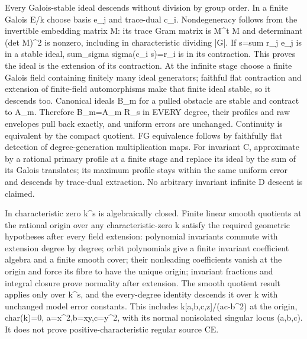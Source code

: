 \documentclass[11pt]{article}
\begin{document}
Every Galois-stable ideal descends without division by group order. In a finite Galois E/k choose basis e\_j and trace-dual c\_i. Nondegeneracy follows from the invertible embedding matrix M: its trace Gram matrix is M\textasciicircum{}t M and determinant (det M)\textasciicircum{}2 is nonzero, including in characteristic dividing |G|. If s=sum r\_j e\_j is in a stable ideal, sum\_sigma sigma(c\_i s)=r\_i is in its contraction. This proves the ideal is the extension of its contraction. At the infinite stage choose a finite Galois field containing finitely many ideal generators; faithful flat contraction and extension of finite-field automorphisms make that finite ideal stable, so it descends too. Canonical ideals B\_m for a pulled obstacle are stable and contract to A\_m. Therefore B\_m=A\_m R\_s in EVERY degree, their profiles and raw envelopes pull back exactly, and uniform errors are unchanged. Continuity is equivalent by the compact quotient. FG equivalence follows by faithfully flat detection of degree-generation multiplication maps. For invariant C, approximate by a rational primary profile at a finite stage and replace its ideal by the sum of its Galois translates; its maximum profile stays within the same uniform error and descends by trace-dual extraction. No arbitrary invariant infinite D descent is claimed.

In characteristic zero k\textasciicircum{}s is algebraically closed. Finite linear smooth quotients at the rational origin over any characteristic-zero k satisfy the required geometric hypotheses after every field extension: polynomial invariants commute with extension degree by degree; orbit polynomials give a finite invariant coefficient algebra and a finite smooth cover; their nonleading coefficients vanish at the origin and force its fibre to have the unique origin; invariant fractions and integral closure prove normality after extension. The smooth quotient result applies only over k\textasciicircum{}s, and the every-degree identity descends it over k with unchanged model error constants. This includes k[a,b,c,z]/(ac-b\textasciicircum{}2) at the origin, char(k)=0, a=x\textasciicircum{}2,b=xy,c=y\textasciicircum{}2, with its normal nonisolated singular locus (a,b,c). It does not prove positive-characteristic regular source CE.
\end{document}
